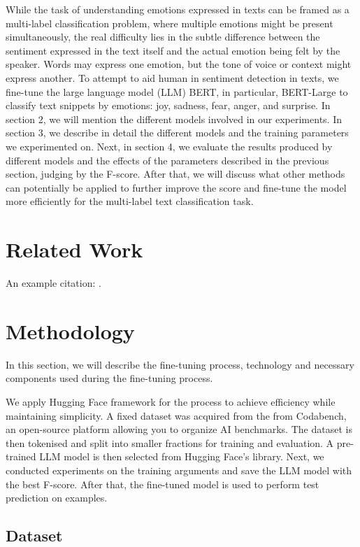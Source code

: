 \documentclass[11pt]{article}
\begin{document}
While the task of understanding emotions expressed in texts can be framed as a multi-label classification problem, where multiple emotions might be present simultaneously, the real difficulty lies in the subtle difference between the sentiment expressed in the text itself and the actual emotion being felt by the speaker. Words may express one emotion, but the tone of voice or context might express another. To attempt to aid human in sentiment detection in texts, we fine-tune the large language model (LLM) BERT, in particular, BERT-Large to classify text snippets by emotions: joy, sadness, fear, anger, and surprise. In section 2, we will mention the different models involved in our experiments. In section 3, we describe in detail the different models and the training parameters we experimented on. Next, in section 4, we evaluate the results produced by different models and the effects of the parameters described in the previous section, judging by the F-score. After that, we will discuss what other methods can potentially be applied to further improve the score and fine-tune the model more efficiently for the multi-label text classification task. 

\section{Related Work}

An example citation: \cite{dijkstra1968goto}.


\section{Methodology}
In this section, we will describe the fine-tuning process, technology and necessary components used during the fine-tuning process. 

We apply Hugging Face framework for the process to achieve efficiency while maintaining simplicity. A fixed dataset was acquired from the from Codabench, an open-source platform allowing you to organize AI benchmarks. The dataset is then tokenised and split into smaller fractions for training and evaluation. A pre-trained LLM model is then selected from Hugging Face’s library. Next, we conducted  experiments on the training arguments and save the LLM model with the best F-score. After that, the fine-tuned model is used to perform test prediction on examples. 
\subsection{Dataset}
\end{document}
